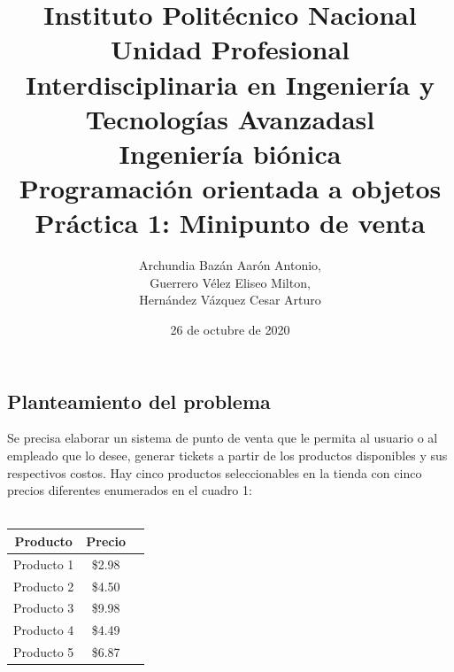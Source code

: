 \documentclass{article}
\begin{document}
\title{\Large Instituto Politécnico Nacional\\
   {\large {\selectfont 
   			{\large Unidad Profesional Interdisciplinaria en Ingeniería y Tecnologías Avanzadasl}\\
   				{\large  Ingeniería biónica }\\
   				{\normalsize Programación orientada a objetos}\\
   			 
   			{\large Práctica 1: Minipunto de venta}\\
   		}
   }}
   \author{Archundia Bazán Aarón Antonio,\\ Guerrero Vélez Eliseo Milton,\\ Hernández Vázquez Cesar Arturo}
\date{26 de octubre de 2020}
\maketitle


	\begin{center}
 \section{ Planteamiento del problema}
     \end{center}


        Se precisa elaborar un sistema de punto de venta que le permita al usuario o al empleado que lo desee, generar tickets a partir de los productos disponibles y sus respectivos costos. Hay cinco productos seleccionables en la tienda con cinco precios diferentes enumerados en el cuadro 1:\\\\
\begin{center}
        \begin{tabular}{|c|c|c}
                \hline
                Producto  & Precio \\
                \hline
                Producto 1 & \$2.98 \\
                \hline
                Producto 2 & \$4.50 \\
                \hline
                Producto 3  & \$9.98 \\
                \hline
                Producto 4 & \$4.49  \\
                \hline
                Producto 5  & \$6.87 \\
                \hline
        
        \end{tabular}
\label{table4}     
\end{center}
\end{document}
